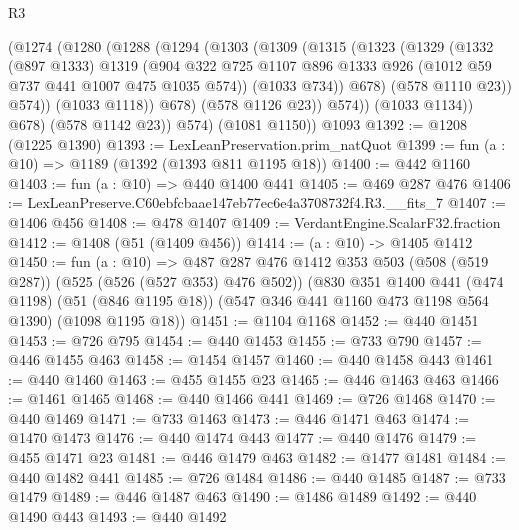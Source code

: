 \begin{lexlean}{R3}
\begin{coremodule}
              (@1274
                (@1280
                  (@1288
                    (@1294
                      (@1303
                        (@1309
                          (@1315
                            (@1323
                              (@1329
                                (@1332
                                  (@897 @1333)
                                  @1319
                                  (@904
                                    @322
                                    @725
                                    @1107
                                    @896
                                    @1333
                                    @926
                                    (@1012 @59 @737 @441 @1007 @475 @1035 @574))
                                  (@1033 @734))
                                @678)
                              (@578 @1110 @23))
                            @574))
                        (@1033 @1118))
                      @678)
                    (@578 @1126 @23))
                  @574))
              (@1033 @1134))
            @678)
          (@578 @1142 @23))
        @574)
      (@1081 @1150))
    @1093
@1392 := @1208 (@1225 @1390)
@1393 := LexLeanPreservation.prim_natQuot
@1399 := fun (a : @10) => @1189 (@1392 (@1393 @811 @1195 @18))
@1400 := @442 @1160
@1403 := fun (a : @10) => @440 @1400 @441
@1405 := @469 @287 @476
@1406 := LexLeanPreserve.C60ebfcbaae147eb77ec6e4a3708732f4.R3.__fits_7
@1407 := @1406 @456
@1408 := @478 @1407
@1409 := VerdantEngine.ScalarF32.fraction
@1412 := @1408 (@51 (@1409 @456))
@1414 := (a : @10) -> @1405 @1412
@1450 := fun (a : @10) =>
  @487
    @287
    @476
    @1412
    @353
    @503
    (@508 (@519 @287))
    (@525 (@526 (@527 @353) @476 @502))
    (@830
      @351
      @1400
      @441
      (@474 @1198)
      (@51 (@846 @1195 @18))
      (@547 @346 @441 @1160 @473 @1198 @564 @1390)
      (@1098 @1195 @18))
@1451 := @1104 @1168
@1452 := @440 @1451
@1453 := @726 @795
@1454 := @440 @1453
@1455 := @733 @790
@1457 := @446 @1455 @463
@1458 := @1454 @1457
@1460 := @440 @1458 @443
@1461 := @440 @1460
@1463 := @455 @1455 @23
@1465 := @446 @1463 @463
@1466 := @1461 @1465
@1468 := @440 @1466 @441
@1469 := @726 @1468
@1470 := @440 @1469
@1471 := @733 @1463
@1473 := @446 @1471 @463
@1474 := @1470 @1473
@1476 := @440 @1474 @443
@1477 := @440 @1476
@1479 := @455 @1471 @23
@1481 := @446 @1479 @463
@1482 := @1477 @1481
@1484 := @440 @1482 @441
@1485 := @726 @1484
@1486 := @440 @1485
@1487 := @733 @1479
@1489 := @446 @1487 @463
@1490 := @1486 @1489
@1492 := @440 @1490 @443
@1493 := @440 @1492

\end{coremodule}
\end{lexlean}
